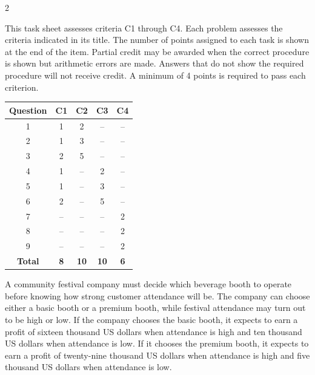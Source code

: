 	\begin{multicols}{2}
		
		This task sheet assesses criteria C1 through C4. Each problem assesses the criteria indicated in its title. The number of points assigned to each task is shown at the end of the item. Partial credit may be awarded when the correct procedure is shown but arithmetic errors are made. Answers that do not show the required procedure will not receive credit. A minimum of 4 points is required to pass each criterion.		\vspace*{-4mm}
		\begin{center}
			\begin{tabular}{|c|c|c|c|c|}
				\hline
				\textbf{Question} & \textbf{C1} & \textbf{C2} & \textbf{C3} & \textbf{C4} \\ \hline
				1 & 1 & 2 & -- & -- \\ \hline
				2 & 1 & 3 & -- & -- \\ \hline
				3 & 2 & 5 & -- & -- \\ \hline
				4 & 1 & -- & 2 & -- \\ \hline
				5 & 1 & -- & 3 & -- \\ \hline
				6 & 2 & -- & 5 & -- \\ \hline
				7 & -- & -- & -- & 2 \\ \hline
				8 & -- & -- & -- & 2 \\ \hline
				9 & -- & -- & -- & 2 \\ \hline
				\textbf{Total} & \textbf{8} & \textbf{10} & \textbf{10} & \textbf{6} \\ \hline
			\end{tabular}
		\end{center}
		\vspace*{-6mm}
		
		A community festival company must decide which beverage booth to operate before knowing how strong customer attendance will be. The company can choose either a basic booth or a premium booth, while festival attendance may turn out to be high or low. If the company chooses the basic booth, it expects to earn a profit of sixteen thousand US dollars when attendance is high and ten thousand US dollars when attendance is low. If it chooses the premium booth, it expects to earn a profit of twenty-nine thousand US dollars when attendance is high and five thousand US dollars when attendance is low.		\vspace*{-2mm}
		

\end{multicols}
